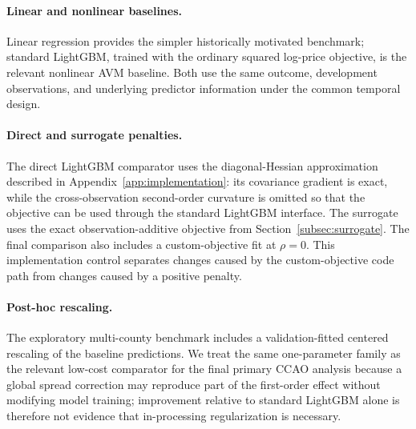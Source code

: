 \documentclass[10pt]{article}
\theoremstyle{definition}
\newcommand{\1}{\mathbf{1}}
\newcommand{\oldtext}[1]{\textcolor{blue}{\sout{#1}}}
\newcommand{\newtext}[1]{\textcolor{impGreen}{#1}}
\begin{document}
\paragraph{Linear and nonlinear baselines.}
\textcolor{impGreen}{Linear regression provides the simpler historically motivated benchmark; standard LightGBM, trained with the ordinary squared log-price objective, is the relevant nonlinear AVM baseline. Both use the same outcome, development observations, and underlying predictor information under the common temporal design.}

\paragraph{Direct and surrogate penalties.}
\textcolor{impGreen}{The direct LightGBM comparator uses the diagonal-Hessian approximation described in Appendix~\ref{app:implementation}: its covariance gradient is exact, while the cross-observation second-order curvature is omitted so that the objective can be used through the standard LightGBM interface. The surrogate uses the exact observation-additive objective from Section~\ref{subsec:surrogate}. The final comparison also includes a custom-objective fit at $\rho=0$. This implementation control separates changes caused by the custom-objective code path from changes caused by a positive penalty.}

\paragraph{Post-hoc rescaling.}
\newtext{The exploratory multi-county benchmark includes a validation-fitted centered rescaling of the baseline predictions. We treat the same one-parameter family as the relevant low-cost comparator for the final primary CCAO analysis because a global spread correction may reproduce part of the first-order effect without modifying model training; improvement relative to standard LightGBM alone is therefore not evidence that in-processing regularization is necessary.}
\end{document}
